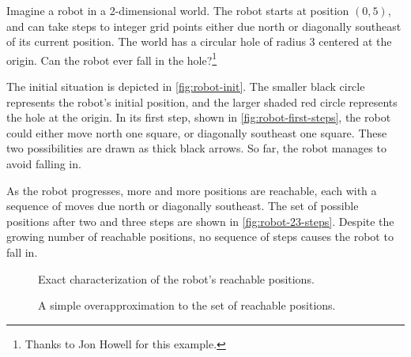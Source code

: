 Imagine a robot in a 2-dimensional world.
The robot starts at position $(0, 5)$,
  and can take steps to integer grid points either
 due north or diagonally southeast of its current position.
The world has a circular hole of radius 3 centered at the origin.
Can the robot ever fall in the hole?\footnote{Thanks to Jon Howell for this example.}

The initial situation is depicted in \cref{fig:robot-init}.
The smaller black circle represents the robot's initial position,
  and the larger shaded red circle represents the hole at the origin.
In its first step, shown in \cref{fig:robot-first-steps},
  the robot could either move north one square,
  or diagonally southeast one square.
These two possibilities are drawn as thick black arrows.
So far, the robot manages to avoid falling in.

As the robot progresses, more and more positions are reachable,
  each with a sequence of moves due north or diagonally southeast.
The set of possible positions after two and three steps
  are shown in \cref{fig:robot-23-steps}.
Despite the growing number of reachable positions,
  no sequence of steps causes the robot to fall in.

\begin{figure}[t]
  \hfil%
  \begin{minipage}{0.45\linewidth}
    \centering
    \caption{Exact characterization of the robot's reachable positions.}
    \label{fig:robot-reachable}
  \end{minipage}%
  \hfil%
  \begin{minipage}{0.45\linewidth}
    \centering
    \caption{A simple overapproximation to the set of reachable positions.}
    \label{fig:robot-inductive-invariant}
  \end{minipage}
  \hfil%
\end{figure}

